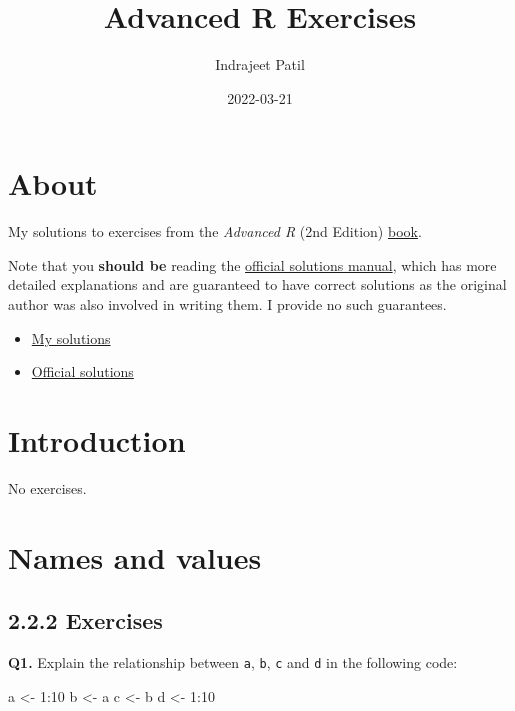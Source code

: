 \documentclass[
]{book}
\title{Advanced R Exercises}
\author{Indrajeet Patil}
\date{2022-03-21}
\newenvironment{Shaded}{\begin{snugshade}}{\end{snugshade}}
\newcommand{\DecValTok}[1]{\textcolor[rgb]{0.00,0.00,0.81}{#1}}
\newcommand{\NormalTok}[1]{#1}
\newcommand{\OtherTok}[1]{\textcolor[rgb]{0.56,0.35,0.01}{#1}}
\newcommand{\SpecialCharTok}[1]{\textcolor[rgb]{0.00,0.00,0.00}{#1}}
\begin{document}
\maketitle

{
\setcounter{tocdepth}{1}
\tableofcontents
}
\hypertarget{about}{%
\chapter*{About}\label{about}}

My solutions to exercises from the \emph{Advanced R} (2nd Edition) \href{https://adv-r.hadley.nz/}{book}.

Note that you \textbf{should be} reading the \href{https://advanced-r-solutions.rbind.io/index.html}{official solutions manual}, which has more detailed explanations and are guaranteed to have correct solutions as the original author was also involved in writing them. I provide no such guarantees. 😬

\begin{itemize}
\item
  \href{https://github.com/IndrajeetPatil/Advanced-R-exercises}{My solutions}
\item
  \href{https://advanced-r-solutions.rbind.io/index.html}{Official solutions}
\end{itemize}

\hypertarget{introduction}{%
\chapter{Introduction}\label{introduction}}

No exercises.

\hypertarget{names-and-values}{%
\chapter{Names and values}\label{names-and-values}}

\hypertarget{exercises}{%
\section{2.2.2 Exercises}\label{exercises}}

\textbf{Q1.} Explain the relationship between \texttt{a}, \texttt{b}, \texttt{c} and \texttt{d} in the following code:

\begin{Shaded}
\begin{Highlighting}[]
\NormalTok{a }\OtherTok{\textless{}{-}} \DecValTok{1}\SpecialCharTok{:}\DecValTok{10}
\NormalTok{b }\OtherTok{\textless{}{-}}\NormalTok{ a}
\NormalTok{c }\OtherTok{\textless{}{-}}\NormalTok{ b}
\NormalTok{d }\OtherTok{\textless{}{-}} \DecValTok{1}\SpecialCharTok{:}\DecValTok{10}
\end{Highlighting}
\end{Shaded}
\end{document}
